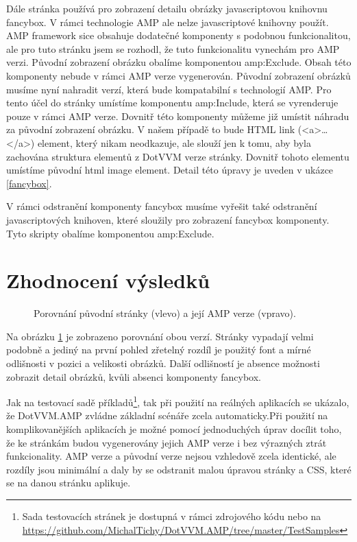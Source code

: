 Dále stránka používá pro zobrazení detailu obrázky javascriptovou knihovnu fancybox. V rámci technologie AMP ale nelze javascriptové knihovny použít. AMP framework sice obsahuje dodatečné komponenty s podobnou funkcionalitou, ale pro tuto stránku jsem se rozhodl, že tuto funkcionalitu vynechám pro AMP verzi. Původní zobrazení obrázku obalíme komponentou amp:Exclude. Obsah této komponenty nebude v rámci AMP verze vygenerován. Původní zobrazení obrázků musíme nyní nahradit verzí, která bude kompatabilní s technologií AMP. Pro tento účel do stránky umístíme komponentu amp:Include, která se vyrenderuje pouze v rámci AMP verze. Dovnitř této komponenty můžeme již umístit náhradu za původní zobrazení obrázku. V našem případě to bude HTML link (<a>\ldots</a>) element, který nikam neodkazuje, ale slouží jen k tomu, aby byla zachována struktura elementů z DotVVM verze stránky. Dovnitř tohoto elementu umístíme původní html image element. Detail této úpravy je uveden v ukázce \ref{fancybox}.

V rámci odstranění komponenty fancybox musíme vyřešit také odstranění javascriptových knihoven, které sloužily pro zobrazení fancybox komponenty. Tyto skripty obalíme komponentou amp:Exclude.




\section{Zhodnocení výsledků}

\begin{figure}[hbt]
\hspace{-20px}
	\caption{Porovnání původní stránky (vlevo) a její AMP verze (vpravo).}
	\label{originalVSamp}
\end{figure}

Na obrázku \ref{originalVSamp} je zobrazeno porovnání obou verzí. Stránky vypadají velmi podobně a jediný na první pohled zřetelný rozdíl je použitý font a mírné odlišnosti v pozici a velikosti obrázků. Další odlišností je absence možnosti zobrazit detail obrázků, kvůli absenci komponenty fancybox.

Jak na testovací sadě příkladů\footnote{ Sada testovacích stránek je dostupná v rámci zdrojového kódu nebo na \url{https://github.com/MichalTichy/DotVVM.AMP/tree/master/TestSamples}}, tak při použití na reálných aplikacích se ukázalo, že DotVVM.AMP zvládne základní scénáře zcela automaticky.Při použití na komplikovanějších aplikacích je možné pomocí jednoduchých úprav docílit toho, že ke stránkám budou vygenerovány jejich AMP verze i bez výrazných ztrát funkcionality. AMP verze a původní verze nejsou vzhledově zcela identické, ale rozdíly jsou minimální a daly by se odstranit malou úpravou stránky a CSS, které se na danou stránku aplikuje.

